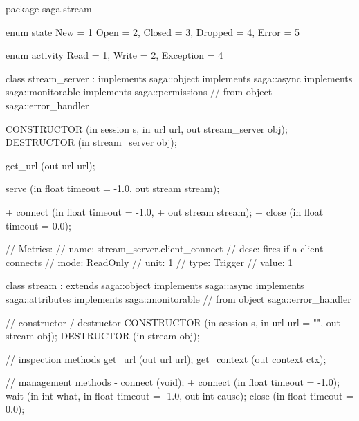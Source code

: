  \begin{myspec}
  package saga.stream
  {
    enum state
    {
      New          =  1
      Open         =  2,
      Closed       =  3,
      Dropped      =  4,
      Error        =  5
    }
 
    enum activity
    {
      Read         =  1,
      Write        =  2,
      Exception    =  4
    }
 
 
    class stream_server  : implements   saga::object
                           implements   saga::async
                           implements   saga::monitorable
                           implements   saga::permissions
                        // from object  saga::error_handler
    {
      CONSTRUCTOR       (in    session         s,
                         in    url             url,
                         out   stream_server   obj);
      DESTRUCTOR        (in    stream_server   obj);
 
      get_url           (out   url             url);

      serve             (in    float           timeout = -1.0,
                         out   stream          stream);
 
+     connect           (in    float           timeout = -1.0,
+                        out   stream          stream);
+
      close             (in    float           timeout = 0.0);
 
      // Metrics:
      //   name:  stream_server.client_connect
      //   desc:  fires if a client connects
      //   mode:  ReadOnly
      //   unit:  1
      //   type:  Trigger
      //   value: 1
    }
 
 
    class stream : extends      saga::object
                   implements   saga::async
                   implements   saga::attributes
                   implements   saga::monitorable
                // from object  saga::error_handler
    {
      // constructor / destructor
      CONSTRUCTOR  (in    session          s,
                    in    url              url = "",
                    out   stream           obj);
      DESTRUCTOR   (in    stream           obj);
 
      // inspection methods
      get_url      (out   url              url);
      get_context  (out   context          ctx);
 
      // management methods
-     connect      (void);
+     connect      (in    float            timeout = -1.0);
      wait         (in    int              what,
                    in    float            timeout = -1.0,
                    out   int              cause);
      close        (in    float            timeout = 0.0);
 
}}
\end{myspec}
